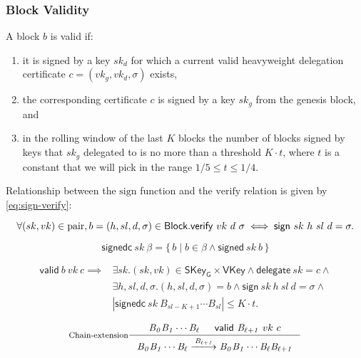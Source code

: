 \documentclass[11pt,a4paper]{article}
\newcommand\Set[2]{\{\,#1\mid#2\,\}}
\newcommand{\var}[1]{\mathit{#1}}
\newcommand{\fun}[1]{\mathsf{#1}}
\newcommand{\type}[1]{\mathsf{#1}}
\newcommand{\trans}[2]{\xlongrightarrow[\textsc{#1}]{#2}}
\newcommand{\Block}{\type{Block}}
\newcommand{\SKeyGen}{\type{SKey_G}}
\newcommand{\VKey}{\type{VKey}}
\newcommand{\signname}{sign}
\newcommand{\signedname}{signed}
\newcommand{\signedseqname}{signedc}
\newcommand{\verifyname}{verify}
\newcommand{\delegatename}{delegate}
\newcommand{\validname}{valid}
\newcommand{\keypairname}{pair}
\newcommand{\sign}[4]{\fun{\signname}\ #1 ~ #2 ~ #3 ~ #4}
\newcommand{\signed}[2]{\fun{\signedname}\ #1 ~ #2}
\newcommand{\signedwindow}[2]{\fun{\signedseqname}\ #1 ~ #2}
\newcommand{\verify}[3]{\fun{\verifyname} ~ #1 ~ #2 ~ #3}
\newcommand{\delegate}[1]{\fun{\delegatename}\ #1}
\newcommand{\valid}[3]{\fun{\validname} ~ #1 ~ #2 ~ #3}
\begin{document}
\subsubsection{Block Validity}
\label{sec:block-valid}

A block $\var{b}$ is valid if:
%
\begin{enumerate}
\item it is signed by a key $\var{sk_d}$ for which a current valid heavyweight delegation
  certificate $c = (vk_g, vk_d, \sigma)$ exists,
\item the corresponding certificate $c$ is signed by a key $sk_g$ from the
  genesis block, and
\item in the rolling window of the last $K$ blocks the number of blocks signed
  by keys that $sk_g$ delegated to is no more than a threshold $K \cdot t$,
  where $t$ is a constant that we will pick in the range
  $1/5 \leq t \leq 1/4$.
\end{enumerate}

Relationship between the $\text{\signname}$ function and the
$\text{\verifyname}$ relation is given by \eqref{eq:sign-verify}:

\begin{equation}
  \label{eq:sign-verify}
  \forall (sk, vk) \in \text{\keypairname}, b = (h, sl, d, \sigma) \in \Block.\\
  \verify{vk}{d}{\sigma} \iff \sign{sk}{h}{sl}{d} = \sigma.
\end{equation}

\begin{equation}
  \label{eq:signed-window}
  \signedwindow{sk}{\beta} = \Set{b}{b \in \beta \wedge \signed{sk}{b}}
\end{equation}

\begin{align}
  \label{eq:valid-block}
    \valid{b}{vk}{c} \implies &
      \exists sk. (sk, vk) \in \SKeyGen \times \VKey \wedge
      \delegate{sk} = c \wedge \\
      & \exists h, sl, d, \sigma. (h, sl, d, \sigma) = b \wedge
        \sign{sk}{h}{sl}{d} = \sigma \wedge \\
      & | \signedwindow{sk}{\var{B_{sl-K+1}} \cdots \var{B_{sl}}} | \leq K \cdot t.
\end{align}

\begin{equation}
  \label{eq:chain-extension}
  \inference[Chain-extension]
  {\var{B_0}\var{B_1}\cdots\var{B_{\ell}} & \valid{\var{B_{\ell+1}}}{vk}{c}
  }
  {{\var{B_0}\var{B_1}\cdots\var{B_{\ell}}} \trans{}{\var{B_{\ell+1}}} {\var{B_0}\var{B_1}\cdots\var{B_{\ell}}\var{B_{\ell+1}}}}
\end{equation}
\end{document}
